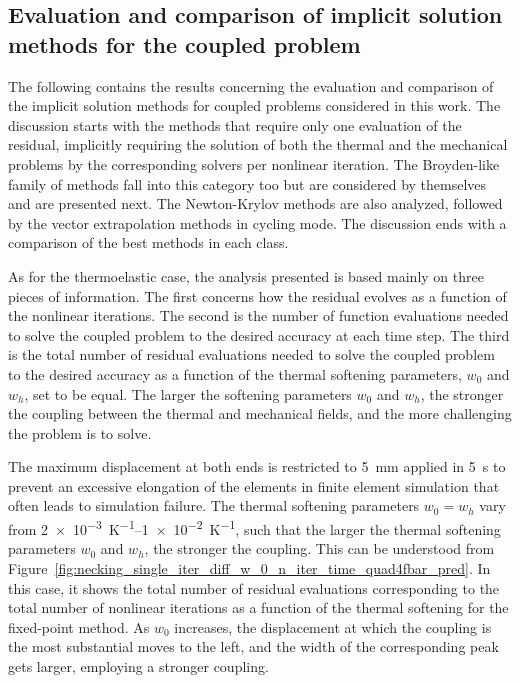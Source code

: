 \begin{figure}
\end{figure}

\FloatBarrier

\subsection{Evaluation and comparison of implicit solution methods for the coupled problem}

The following contains the results concerning the evaluation and comparison of the implicit solution methods for coupled problems considered in this work.
The discussion starts with the methods that require only one evaluation of the residual, implicitly requiring the solution of both the thermal and the mechanical problems by the corresponding solvers per nonlinear iteration.
The Broyden-like family of methods fall into this category too but are considered by themselves and are presented next.
The Newton-Krylov methods are also analyzed, followed by the vector extrapolation methods in cycling mode.
The discussion ends with a comparison of the best methods in each class.

As for the thermoelastic case, the analysis presented is based mainly on three pieces of information.
The first concerns how the residual evolves as a function of the nonlinear iterations.
The second is the number of function evaluations needed to solve the coupled problem to the desired accuracy at each time step.
The third is the total number of residual evaluations needed to solve the coupled problem to the desired accuracy as a function of the thermal softening parameters, \(w_0\) and \(w_h\), set to be equal.
The larger the softening parameters \(w_0\) and \(w_h\), the stronger the coupling between the thermal and mechanical fields, and the more challenging the problem is to solve.

The maximum displacement at both ends is restricted to \SI{5}{\milli\meter} applied in \SI{5}{\second} to prevent an excessive elongation of the elements in finite element simulation that often leads to simulation failure.
The thermal softening parameters \(w_0=w_h\) vary from \SIrange{2e-3}{1e-2}{\kelvin^{-1}}, such that the larger the thermal softening parameters \(w_0\) and \(w_h\), the stronger the coupling.
This can be understood from Figure~\ref{fig:necking_single_iter_diff_w_0_n_iter_time_quad4fbar_pred}.
In this case, it shows the total number of residual evaluations corresponding to the total number of nonlinear iterations as a function of the thermal softening for the fixed-point method.
As \(w_0\) increases, the displacement at which the coupling is the most substantial moves to the left, and the width of the corresponding peak gets larger, employing a stronger coupling.

